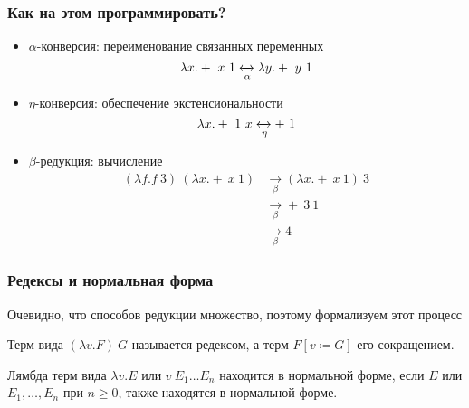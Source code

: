 \documentclass[aspectratio=169]{beamer}
\begin{document}
\begin{frame}
    \frametitle{Как на этом программировать?}

    \begin{itemize}
        \item $\alpha$-конверсия: переименование связанных переменных
              \[\lambda x.+\ x\ 1 \xleftrightarrow[\alpha]{} \lambda y.+\ y\ 1\]
        \item $\eta$-конверсия: обеспечение экстенсиональности
              \[\lambda x.+\ 1\ x \xleftrightarrow[\eta]{} +\ 1\]
        \item $\beta$-редукция: вычисление
              \begin{align*}
                  (\lambda f.f\ 3)\ (\lambda x.+\ x\ 1) & \xrightarrow[\beta]{} (\lambda x.+\ x\ 1)\ 3 \\
                                                        & \xrightarrow[\beta]{} +\ 3\ 1                \\
                                                        & \xrightarrow[\beta]{} 4
              \end{align*}
    \end{itemize}
\end{frame}

\begin{frame}
    \frametitle{Редексы и нормальная форма}

    Очевидно, что способов редукции множество, поэтому формализуем этот процесс

    \begin{definition}
        Терм вида $(\lambda v. F)\ G$ называется редексом, а терм $F[v \coloneq G]$ его сокращением.
    \end{definition}
    \begin{definition}
        Лямбда терм вида $\lambda v. E$ или $v\ E_1 \dots E_n$ находится в нормальной форме, если $E$ или $E_1, \dots, E_n$ при $n \ge 0$, также находятся в нормальной форме.
    \end{definition}

\end{frame}
\end{document}
